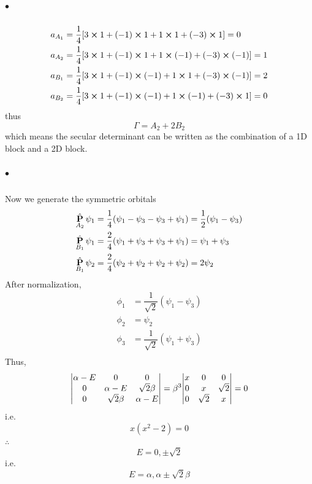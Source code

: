 \documentclass[a4paper]{article}
\DeclareMathOperator{\hP}{\hat{\vb{P}}}          %
\newcommand{\subex}[1]{\subparagraph{#1}}
\numberwithin{equation}{section}
\begin{document}
\subex{$ \bullet $}
\begin{align}
a_{A_1} &= \dfrac{1}{4}[3\cross 1 + (-1)\cross 1 + 1\cross 1 + (-3)\cross 1] = 0\\
a_{A_2} &= \dfrac{1}{4}[3\cross 1 + (-1)\cross 1 + 1\cross (-1) + (-3)\cross (-1)] = 1\\
a_{B_1} &= \dfrac{1}{4}[3\cross 1 + (-1)\cross (-1) + 1\cross 1 + (-3)\cross (-1)] = 2\\
a_{B_2} &= \dfrac{1}{4}[3\cross 1 + (-1)\cross (-1) + 1\cross (-1) + (-3)\cross 1] = 0
\end{align}
thus
\begin{equation}\label{key}
\Gamma = A_2 + 2B_2
\end{equation}
which means the secular determinant can be written as the combination of a 1D block and a 2D block.
\subex{$ \bullet $}
Now we generate the symmetric orbitals
\begin{align}
\hP_{A_2}\psi_1 &= \dfrac{1}{4}(\psi_1 - \psi_3 - \psi_3 + \psi_1) = \dfrac{1}{2}(\psi_1 - \psi_3)\\
\hP_{B_1}\psi_1 &= \dfrac{2}{4}(\psi_1 + \psi_3 + \psi_3 + \psi_1) = \psi_1 + \psi_3\\
\hP_{B_1}\psi_2 &= \dfrac{2}{4}(\psi_2 + \psi_2 + \psi_2 + \psi_2) = 2\psi_2\\
\end{align}
After normalization,
\begin{align}
\phi_1 &= \dfrac{1}{\sqrt{2}}(\psi_1 - \psi_3)\\
\phi_2 &= \psi_2\\
\phi_3 &= \dfrac{1}{\sqrt{2}}(\psi_1 + \psi_3)\\
\end{align}
Thus,
\begin{equation}\label{key}
\mqty|\alpha - E & 0 & 0\\ 0 & \alpha - E & \sqrt{2}\beta\\ 0 & \sqrt{2}\beta & \alpha - E| 
= \beta^3\mqty|x & 0 & 0\\ 0 & x & \sqrt{2}\\ 0 & \sqrt{2} & x| = 0
\end{equation}
i.e.
\begin{equation}\label{key}
x(x^2 -2) = 0
\end{equation}
$ \therefore $
\begin{equation}\label{key}
E = 0, \pm\sqrt{2}
\end{equation}
i.e.
\begin{equation}\label{key}
E = \alpha, \alpha\pm\sqrt{2}\beta
\end{equation}
\end{document}
